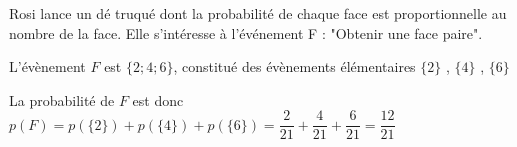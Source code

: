 \begin{pageCours}
\begin{Ex}
Rosi lance un dé truqué dont la probabilité de chaque face est proportionnelle au nombre de la face.
Elle s'intéresse à l'événement F : "Obtenir une face paire".  

  L'évènement $F$ est $\lbrace 2;4;6 \rbrace$, constitué des évènements élémentaires $\lbrace 2 \rbrace$ , $\lbrace 4 \rbrace$ , $\lbrace 6 \rbrace$ 
 

La probabilité de $F$ est donc $p(F) = p\left( \lbrace 2 \rbrace\right) + p\left(\lbrace 4 \rbrace\right) + p\left(\lbrace 6 \rbrace \right)  =\dfrac{2}{21} + \dfrac{4}{21} + \dfrac{6}{21} = \dfrac{12}{21}$


\end{Ex}


\end{pageCours} 
